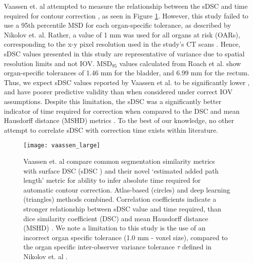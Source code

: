 Vaassen et. al attempted to measure the relationship between the sDSC and time required for contour correction \cite{vaassen2020}, as seen in Figure \ref{fig:vaassen}. However, this study failed to use a 95th percentile MSD for each organ-specific tolerance, as described by Nikolov et. al. Rather, a value of 1 mm was used for all organs at risk (OARs), corresponding to the x-y pixel resolution used in the study's CT scans \cite{vaassen2020}. Hence, sDSC values presented in this study are representative of variance due to spatial resolution limits and not IOV. MSD$_{95}$ values calculated from Roach et al. show organ-specific tolerances of 1.46 mm for the bladder, and 6.99 mm for the rectum. Thus, we expect sDSC values reported by Vaassen et al. to be significantly lower \cite{Nikolov_2018}, and have poorer predictive validity than when considered under correct IOV assumptions. Despite this limitation, the sDSC was a significantly better indicator of time required for correction when compared to the DSC and mean Hausdorff distance (MSHD) metrics \cite{vaassen2020}. To the best of our knowledge, no other attempt to correlate sDSC with correction time exists within literature.

\begin{figure}[H]
	\begin{center}
		\texttt{[image: vaassen\_large]}
		\caption{Vaassen et. al compare common segmentation similarity metrics with surface DSC (sDSC \cite{Nikolov_2018}) and their novel `estimated added path length' metric for ability to infer absolute time required for automatic contour correction. Atlas-based (circles) and deep learning (triangles) methods combined. Correlation coefficients indicate a stronger relationship between sDSC value and time required, than dice similarity coefficient (DSC) and mean Hausdorff distance (MSHD) \cite{Vaassen_2020}. We note a limitation to this study is the use of an incorrect organ specific tolerance (1.0 mm - voxel size), compared to the organ specific inter-observer variance tolerance $\tau$ defined in Nikolov et. al \cite{Nikolov_2018}.}
		\label{fig:vaassen}
	\end{center}
\end{figure}






